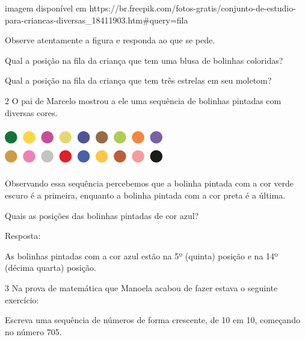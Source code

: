 \begin{escolha}
\inserir imagem disponível em https://br.freepik.com/fotos-gratis/conjunto-de-estudio-para-criancas-diversas_18411903.htm#query=fila%

Observe atentamente a figura e responda ao que se pede.

\begin{escolha}

  \item Qual a posição na fila da criança que tem uma blusa de bolinhas coloridas?


  \item Qual a posição na fila da criança que tem três estrelas em seu moletom?


\end{escolha}

\num{2} O pai de Marcelo mostrou a ele uma sequência de bolinhas pintadas com
diversas cores.


\includegraphics[width=2.72524in,height=0.68339in]{media/image28.png}

Observando essa sequência percebemos que a bolinha pintada com a cor
verde escuro é a primeira, enquanto a bolinha pintada com a cor preta é a
última.

Quais as posições das bolinhas pintadas de cor azul?


Resposta:

As bolinhas pintadas com a cor azul estão na 5º (quinta) posição e na
14º (décima quarta) posição.

\num{3} Na prova de matemática que Manoela acabou de fazer estava o seguinte exercício:

Escreva uma sequência de números de forma crescente, de 10 em 10, começando no número 705.


\end{escolha}
